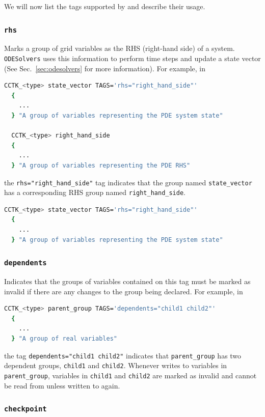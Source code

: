 We will now list the tags supported by \CarpetX\space and describe their usage.

\subsubsection{\texttt{rhs}}

Marks a group of grid variables as the RHS (right-hand side) of a system. \texttt{ODESolvers} uses this information to perform time steps and update a state vector (See Sec.~\ref{sec:odesolvers} for more information). For example, in
%
\begin{lstlisting}[language=bash]
  CCTK_<type> state_vector TAGS='rhs="right_hand_side"'
  {
    ...
  } "A group of variables representing the PDE system state"

  CCTK_<type> right_hand_side
  {
    ...
  } "A group of variables representing the PDE RHS"
\end{lstlisting}
%
the \texttt{rhs="right\_hand\_side"} tag indicates that the group named \texttt{state\_vector} has a corresponding RHS group named \texttt{right\_hand\_side}.

\begin{lstlisting}[language=bash]
  CCTK_<type> state_vector TAGS='rhs="right_hand_side"'
  {
    ...
  } "A group of variables representing the PDE system state"
\end{lstlisting}

\subsubsection{\texttt{dependents}}

Indicates that the groups of variables contained on this tag must be marked as invalid if there are any changes to the group being declared. For example, in
%
\begin{lstlisting}[language=bash]
  CCTK_<type> parent_group TAGS='dependents="child1 child2"'
  {
    ...
  } "A group of real variables"
\end{lstlisting}
%
the tag \texttt{dependents="child1 child2"} indicates that \texttt{parent\_group} has two dependent groups, \texttt{child1} and \texttt{child2}. Whenever \CarpetX\space writes to variables in \texttt{parent\_group}, variables in \texttt{child1} and \texttt{child2} are marked as invalid and cannot be read from unless written to again.

\subsubsection{\texttt{checkpoint}}

